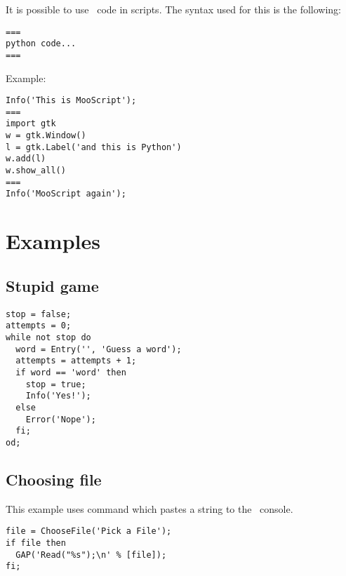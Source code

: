 It is possible to use \python\ code in scripts. The syntax used for this is the
following:
\begin{verbatim}
===
python code...
===
\end{verbatim}
Example:
\begin{verbatim}
Info('This is MooScript');
===
import gtk
w = gtk.Window()
l = gtk.Label('and this is Python')
w.add(l)
w.show_all()
===
Info('MooScript again');
\end{verbatim}



\section{Examples}

\subsection{Stupid game}
\begin{verbatim}
stop = false;
attempts = 0;
while not stop do
  word = Entry('', 'Guess a word');
  attempts = attempts + 1;
  if word == 'word' then
    stop = true;
    Info('Yes!');
  else
    Error('Nope');
  fi;
od;
\end{verbatim}

\subsection{Choosing file}
This example uses  command which pastes a string to the \gap\
console.
\begin{verbatim}
file = ChooseFile('Pick a File');
if file then
  GAP('Read("%s");\n' % [file]);
fi;
\end{verbatim}
